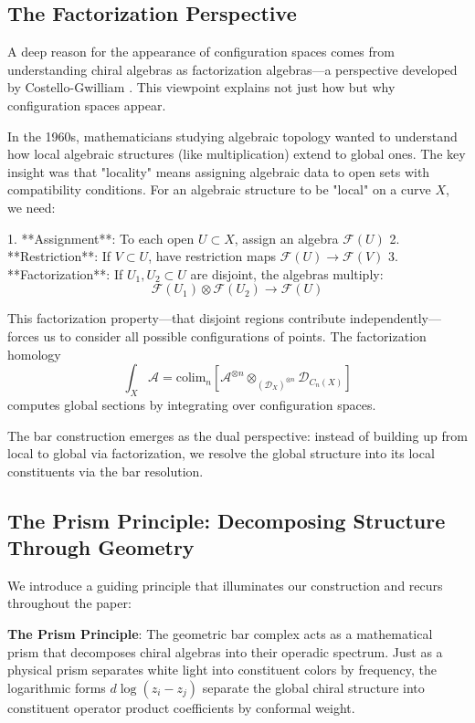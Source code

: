 \subsection{The Factorization Perspective}

A deep reason for the appearance of configuration spaces comes from understanding chiral algebras as factorization algebras—a perspective developed by Costello-Gwilliam \cite{CG17}. This viewpoint explains not just how but why configuration spaces appear.

In the 1960s, mathematicians studying algebraic topology wanted to understand how local algebraic structures (like multiplication) extend to global ones. The key insight was that "locality" means assigning algebraic data to open sets with compatibility conditions. For an algebraic structure to be "local" on a curve $X$, we need:

1. **Assignment**: To each open $U \subset X$, assign an algebra $\mathcal{F}(U)$
2. **Restriction**: If $V \subset U$, have restriction maps $\mathcal{F}(U) \to \mathcal{F}(V)$
3. **Factorization**: If $U_1, U_2 \subset U$ are disjoint, the algebras multiply:
   $$\mathcal{F}(U_1) \otimes \mathcal{F}(U_2) \to \mathcal{F}(U)$$

This factorization property—that disjoint regions contribute independently—forces us to consider all possible configurations of points. The factorization homology
$$\int_X \mathcal{A} = \text{colim}_n \left[ \mathcal{A}^{\otimes n} \otimes_{(\mathcal{D}_X)^{\otimes n}} \mathcal{D}_{C_n(X)} \right]$$
computes global sections by integrating over configuration spaces.

The bar construction emerges as the dual perspective: instead of building up from local to global via factorization, we resolve the global structure into its local constituents via the bar resolution.

\subsection{The Prism Principle: Decomposing Structure Through Geometry}

We introduce a guiding principle that illuminates our construction and recurs throughout the paper:

\textbf{The Prism Principle}: The geometric bar complex acts as a mathematical prism that decomposes chiral algebras into their operadic spectrum. Just as a physical prism separates white light into constituent colors by frequency, the logarithmic forms $d\log(z_i - z_j)$ separate the global chiral structure into constituent operator product coefficients by conformal weight.

